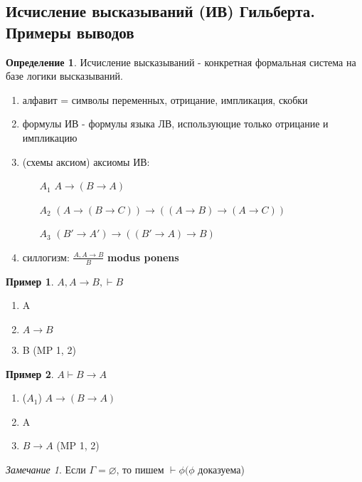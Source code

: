 \documentclass[a4paper]{article}
\theoremstyle{definition}
\newtheorem*{example}{Пример}
\newtheorem*{definition}{Определение}
\theoremstyle{remark}
\newtheorem*{remark}{Замечание}
\begin{document}
    \subsection{Исчисление высказываний (ИВ) Гильберта. Примеры выводов}
    \begin{definition}
        Исчисление высказываний - конкретная формальная система на базе логики высказываний.
        \begin{enumerate}
            \item алфавит = символы переменных, отрицание, импликация, скобки
            \item формулы ИВ -  формулы языка ЛВ, использующие только отрицание и импликацию
            \item (схемы аксиом) аксиомы ИВ:
            \begin{itemize}
                \item[$A_1$] $A\rightarrow (B\rightarrow A)$ 
                \item[$A_2$] $(A\rightarrow (B\rightarrow C))\rightarrow ((A\rightarrow B)\rightarrow (A \rightarrow C))$ 
                \item[$A_3$] $(B'\rightarrow A')\rightarrow((B'\rightarrow A)\rightarrow B)$
            \end{itemize}
            \item силлогизм: $\frac{A, A\rightarrow B}{B}$ \textbf{modus ponens}
        \end{enumerate}
    \end{definition}
    \begin{example}
        $A, A\rightarrow B, \vdash B$
        \begin{enumerate}
            \item A
            \item $A\rightarrow B$
            \item B (MP 1, 2)
        \end{enumerate}
    \end{example}
    \begin{example}
        $A \vdash B\rightarrow A$
        \begin{enumerate}
            \item($A_1$) $A\rightarrow (B\rightarrow A)$ 
            \item A
            \item $B\rightarrow A$ (MP 1, 2)
        \end{enumerate}
    \end{example}
    \begin{remark}
        Если $\Gamma=\varnothing$, то пишем $\vdash \phi(\phi$ доказуема)
    \end{remark}
\end{document}
